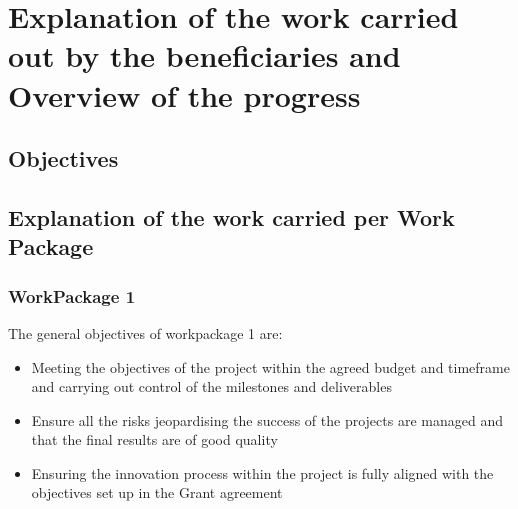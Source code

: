 \documentclass{deliverablereport}
\begin{document}
\enlargethispage{4ex}
\maketitle
\githubissuedescription
\tableofcontents\newpage



\section{Explanation of the work carried out by the beneficiaries and Overview of the progress}


\subsection{Objectives}


\subsection{Explanation of the work carried per Work Package}
\subsubsection{WorkPackage 1}


The general objectives of workpackage 1 are:

\begin{itemize}
\item{Meeting the objectives of the project within the agreed budget and timeframe and carrying out control of the milestones and deliverables}
\item{Ensure all the risks jeopardising the success of the projects are managed and that the final results are of good quality}
\item{Ensuring the innovation process within the project is fully aligned with the objectives set up in the Grant agreement}
\end{itemize}
\end{document}
